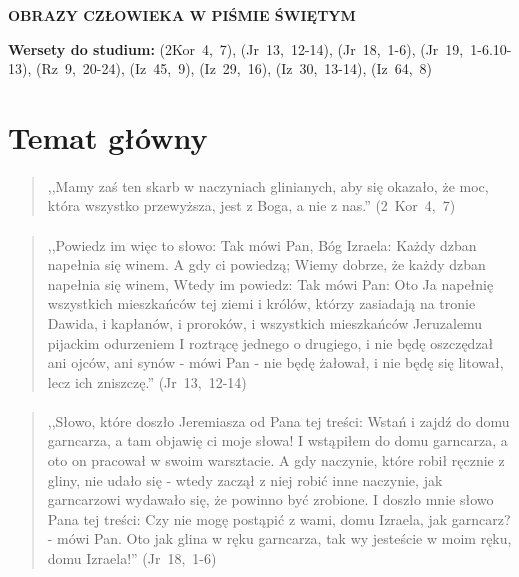 \documentclass[10pt,a4paper,oneside]{article}
\begin{document}
\centerline{\textbf{\MakeUppercase{Obrazy człowieka w Piśmie Świętym}}}
\begin{center}
\textbf{Wersety do studium:} \mbox{(2Kor 4, 7)}, \mbox{(Jr 13, 12-14)}, \mbox{(Jr 18, 1-6)}, \mbox{(Jr 19, 1-6.10-13)}, \mbox{(Rz 9, 20-24)}, \mbox{(Iz 45, 9)}, \mbox{(Iz 29, 16)}, \mbox{(Iz 30, 13-14)}, \mbox{(Iz 64, 8)}
\end{center}
\section{Temat główny}
\paragraph{}
\begin{quote}
,,Mamy zaś ten skarb w naczyniach glinianych, aby się okazało, że moc, która wszystko przewyższa, jest z Boga, a nie z nas.'' \mbox{(2 Kor 4, 7)}
\end{quote}
\paragraph{}
\begin{quote}
,,Powiedz im więc to słowo: Tak mówi Pan, Bóg Izraela: Każdy dzban napełnia się winem. A gdy ci powiedzą; Wiemy dobrze, że każdy dzban napełnia się winem, Wtedy im powiedz: Tak mówi Pan: Oto Ja napełnię wszystkich mieszkańców tej ziemi i królów, którzy zasiadają na tronie Dawida, i kapłanów, i proroków, i wszystkich mieszkańców Jeruzalemu pijackim odurzeniem I roztrącę jednego o drugiego, i nie będę oszczędzał ani ojców, ani synów - mówi Pan - nie będę żałował, i nie będę się litował, lecz ich zniszczę.'' \mbox{(Jr 13, 12-14)}
\end{quote}
\paragraph{}
\begin{quote}
,,Słowo, które doszło Jeremiasza od Pana tej treści: Wstań i zajdź do domu garncarza, a tam objawię ci moje słowa! I wstąpiłem do domu garncarza, a oto on pracował w swoim warsztacie. A gdy naczynie, które robił ręcznie z gliny, nie udało się - wtedy zaczął z niej robić inne naczynie, jak garncarzowi wydawało się, że powinno być zrobione. I doszło mnie słowo Pana tej treści: Czy nie mogę postąpić z wami, domu Izraela, jak garncarz? - mówi Pan. Oto jak glina w ręku garncarza, tak wy jesteście w moim ręku, domu Izraela!'' \mbox{(Jr 18, 1-6)}
\end{quote}
\end{document}
